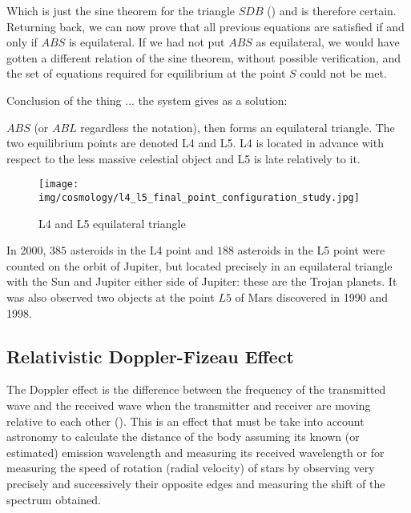	Which is just the sine theorem for the triangle $SDB$ () and is therefore certain. Returning back, we can now prove that all previous equations are satisfied if and only if $ABS$ is equilateral. If we had not put $ABS$ as equilateral, we would have gotten a different relation of the sine theorem, without possible verification, and the set of equations required for equilibrium at the point $S$ could not be met.

	Conclusion of the thing ... the system gives as a solution:
	
	$ABS$ (or $ABL$ regardless the notation), then forms an equilateral triangle. The two equilibrium points are denoted L4 and L5. L4 is located in advance with respect to the less massive celestial object and L5 is late relatively to it.
	\begin{figure}[H]
		\begin{center}
		\texttt{[image: img/cosmology/l4\_l5\_final\_point\_configuration\_study.jpg]}
		\end{center}	
		\caption[]{L4 and L5 equilateral triangle}
	\end{figure}
	In 2000, $385$ asteroids in the L4 point and $188$ asteroids in the L5 point were counted on the orbit of Jupiter, but located precisely in an equilateral triangle with the Sun and Jupiter either side of Jupiter: these are the Trojan planets. It was also observed two objects at the point $L5$ of Mars discovered in 1990 and 1998.
	
	\pagebreak
	\subsection{Relativistic Doppler-Fizeau Effect}
	The Doppler effect is the difference between the frequency of the transmitted wave and the received wave when the transmitter and receiver are moving relative to each other (). This is an effect that must be take into account astronomy to calculate the distance of the body assuming its known (or estimated)  emission wavelength and measuring its received wavelength or for measuring the speed of rotation (radial velocity) of stars by observing very precisely and successively their opposite edges and measuring the shift of the spectrum obtained.


